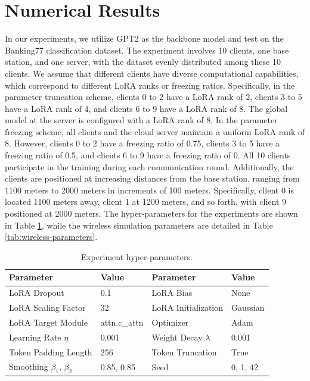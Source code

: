 \documentclass[journal]{IEEEtran}
\begin{document}
\section{Numerical Results}
In our experiments, we utilize GPT2\cite{radford2019language} as the backbone model and test on the Banking77 classification dataset\cite{casanueva-etal-2020-efficient}. The experiment involves 10 clients, one base station, and one server, with the dataset evenly distributed among these 10 clients. We assume that different clients have diverse computational capabilities, which correspond to different LoRA ranks or freezing ratios.
Specifically, in the parameter truncation scheme, clients 0 to 2 have a LoRA rank of 2, clients 3 to 5 have a LoRA rank of 4, and clients 6 to 9 have a LoRA rank of 8. The global model at the server is configured with a LoRA rank of 8. 
In the parameter freezing scheme, all clients and the cloud server maintain a uniform LoRA rank of 8. However, clients 0 to 2 have a freezing ratio of 0.75, clients 3 to 5 have a freezing ratio of 0.5, and clients 6 to 9 have a freezing ratio of 0.
All 10 clients participate in the training during each communication round. Additionally, the clients are positioned at increasing distances from the base station, ranging from 1100 meters to 2000 meters in increments of 100 meters. 
Specifically, client 0 is located 1100 meters away, client 1 at 1200 meters, and so forth, with client 9 positioned at 2000 meters.
The hyper-parameters for the experiments are shown in Table \ref{tab:experiment-parameters}, while the wireless simulation parameters are detailed in Table \ref{tab:wireless-parameters}.
\begin{table}[h]
\centering
\renewcommand{\arraystretch}{1.2}
\caption{Experiment hyper-parameters.}
\label{tab:experiment-parameters}
\begin{tabular}{|l|l|l|l|}
\hline
\textbf{Parameter} & \textbf{Value} & \textbf{Parameter} & \textbf{Value} \\ \hline
LoRA Dropout & 0.1 & LoRA Bias & None \\ \hline
LoRA Scaling Factor & 32 & LoRA Initialization & Gaussian \\ \hline
LoRA Target Module & attn.c\_attn & Optimizer & Adam \\ \hline
Learning Rate $\eta$& 0.001 & Weight Decay $\lambda$ & 0.001 \\ \hline
Token Padding Length & 256 & Token Truncation & True \\ \hline
Smoothing $\beta_1$, $\beta_2$ & 0.85, 0.85 & Seed & 0, 1, 42 \\ \hline
\end{tabular}
\end{table}
\end{document}
